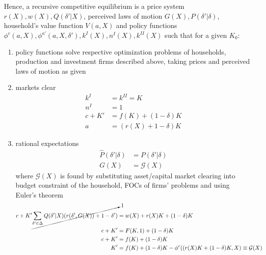 \documentclass[]{article}
\begin{document}
Hence, a recursive competitive equilibrium is a price system $r(X), w(X), Q(\delta'|X)$, perceived laws of motion $G(X), \hat{P}(\delta'|\delta)$, household's value function $V(a, X)$ and policy functions $\phi^c(a, X), \phi^{a'}(a, X, \delta'), k^I(X), n^I(X), k^{II}(X)$ such that for a given $K_0$:
\begin{enumerate}[label=\roman*)]
	\item policy functions solve respective optimization problems of households, production and investment firms described above, taking prices and perceived laws of motion as given
	\item markets clear
	\begin{equation}
		\begin{split}
			k^I& = k^{II} = K \\ \nonumber
			n^I& = 1 \\
			c + K'& = f(K) + (1 - \delta)K \\
			a& = (r(X) + 1 - \delta)K
		\end{split}
	\end{equation}
	\item rational expectations
	\begin{equation}
		\begin{split}
		\hat{P}(\delta'|\delta)& = P(\delta'|\delta) \\ \nonumber
		G(X)& = \mathcal{G}(X)
		\end{split}
	\end{equation}
	where $\mathcal{G}(X)$ is found by substituting asset/capital market clearing into budget constraint of the household, FOCs of firms' problems and using Euler's theorem
	\begin{equation}
		\begin{split}
			c + K'\cancelto{1}{\sum\limits_{\delta'\in\Delta}Q(\delta'|X)(r(\delta', G(X)) + 1 - \delta')}& = w(X) + r(X)K + (1 - \delta)K \\ \nonumber
			c + K'& = F(K, 1) + (1 - \delta)K \\
			c + K'& = f(K) + (1 - \delta)K \\
			K'& = f(K) + (1 - \delta)K - \phi^c((r(X)K + (1 - \delta)K, X) \equiv \mathcal{G}(X)\\
		\end{split}
	\end{equation}
\end{enumerate}
\end{document}
